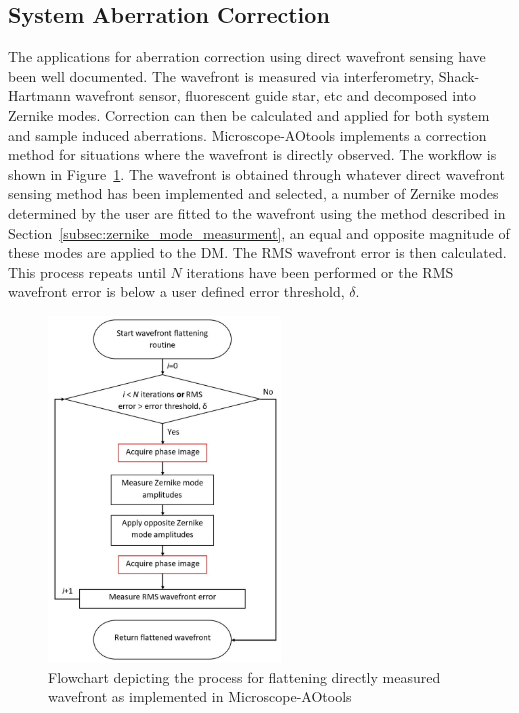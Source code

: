 \subsection{System Aberration Correction}
\label{subsec:system_correction}

The applications for aberration correction using direct wavefront sensing 
have been well documented. The wavefront is measured via interferometry, 
Shack-Hartmann wavefront sensor, fluorescent guide star, etc and decomposed 
into Zernike modes. Correction can then be calculated and applied for both 
system and sample induced aberrations. Microscope-AOtools implements a 
correction method for situations where the wavefront is directly observed. 
The workflow is shown in 
Figure~\ref{fig:direct_wavefront_flattening_workflow}. The wavefront is 
obtained through whatever direct wavefront sensing method has been 
implemented and selected, a number of Zernike modes determined by the user 
are fitted to the wavefront using the method described in 
Section~\ref{subsec:zernike_mode_measurment}, an equal and opposite magnitude 
of these modes are applied to the DM. The RMS wavefront error is then 
calculated. This process repeats until $N$ iterations have been performed or 
the RMS wavefront error is below a user defined error threshold, $\delta$.

\begin{figure}[h]
	\centering
	\includegraphics[width=0.55\textwidth, scale=0.5]{./images/direct_wavefront_flattening_workflow.jpg}
	\caption[Direct wavefront correction workflow]{Flowchart depicting the process for flattening directly measured wavefront as implemented in Microscope-AOtools}
	\label{fig:direct_wavefront_flattening_workflow}
\end{figure}

